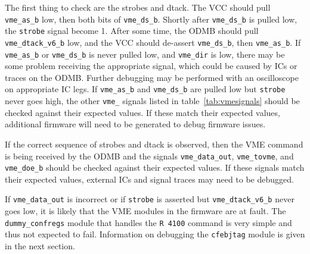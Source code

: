 \documentclass[10pt,a4paper]{article}
\begin{document}
The first thing to check are the strobes and dtack. The VCC should pull \texttt{vme\_as\_b} low, then both bits of \texttt{vme\_ds\_b}. Shortly after \texttt{vme\_ds\_b} is pulled low, the \texttt{strobe} signal become 1. After some time, the ODMB should pull \texttt{vme\_dtack\_v6\_b} low, and the VCC should de-assert \texttt{vme\_ds\_b}, then \texttt{vme\_as\_b}. If \texttt{vme\_as\_b} or \texttt{vme\_ds\_b} is never pulled low, and \texttt{vme\_dir} is low, there may be some problem receiving the appropriate signal, which could be caused by ICs or traces on the ODMB. Further debugging may be performed with an oscilloscope on appropriate IC legs. If \texttt{vme\_as\_b} and \texttt{vme\_ds\_b} are pulled low but \texttt{strobe} never goes high, the other \texttt{vme\_} signals listed in table~\ref{tab:vmesignals} should be checked against their expected values. If these match their expected values, additional firmware will need to be generated to debug firmware issues.

If the correct sequence of strobes and dtack is observed, then the VME command is being received by the ODMB and the signals \texttt{vme\_data\_out}, \texttt{vme\_tovme}, and \texttt{vme\_doe\_b} should be checked against their expected values. If these signals match their expected values, external ICs and signal traces may need to be debugged. 

If \texttt{vme\_data\_out} is incorrect or if \texttt{strobe} is asserted but \texttt{vme\_dtack\_v6\_b} never goes low, it is likely that the VME modules in the firmware are at fault. The \texttt{dummy\_confregs} module that handles the \texttt{R 4100} command is very simple and thus not expected to fail. Information on debugging the \texttt{cfebjtag} module is given in the next section.
\end{document}
